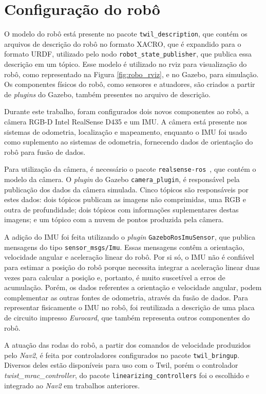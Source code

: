 \documentclass[repeatfields,xlists,xpacks,oneside,yearsonly]{ufrgscca}
\begin{document}
\section{Configuração do robô}

O modelo do robô está presente no pacote \texttt{twil\_description},
que contém os arquivos de descrição do robô no formato XACRO, que é
expandido para o formato URDF, utilizado pelo nodo
\texttt{robot\_state\_publisher}, que publica essa descrição em um
tópico. Esse modelo é utilizado no rviz para visualização do robô,
como representado na Figura \ref{fig:robo_rviz}, e no Gazebo, para
simulação. Os componentes físicos do robô, como sensores e atuadores,
são criados a partir de \textit{plugins} do Gazebo, também presentes
no arquivo de descrição.

Durante este trabalho, foram configurados dois novos componentes ao
robô, a câmera RGB-D Intel RealSense D435 e um IMU. A câmera está
presente nos sistemas de odometria, localização e mapeamento,
enquanto o IMU foi usado como suplemento ao sistemas de odometria,
fornecendo dados de orientação do robô para fusão de dados.

Para utilização da câmera, é necessário o pacote
\texttt{realsense-ros}~\cite{realsense_ros}, que contém o modelo da
câmera. O \textit{plugin} do Gazebo \texttt{camera\_plugin}, é
responsável pela publicação dos dados da câmera simulada. Cinco
tópicos são responsáveis por estes dados: dois tópicos publicam as
imagens não comprimidas, uma RGB e outra de profundidade; dois
tópicos com informações suplementares destas imagens; e um tópico com
a nuvem de pontos produzida pela câmera.

A adição do IMU foi feita utilizando o \textit{plugin}
\texttt{GazeboRosImuSensor}, que publica mensagens do tipo
\texttt{sensor\_msgs/Imu}. Essas mensagens contêm a orientação,
velocidade angular e aceleração linear do robô. Por si só, o IMU não
é confiável para estimar a posição do robô porque necessita integrar
a aceleração linear duas vezes para calcular a posição e, portanto, é
muito suscetível a erros de acumulação. Porém, os dados referentes a
orientação e velocidade angular, podem complementar as outras fontes
de odometria, através da fusão de dados. Para representar fisicamente
o IMU no robô, foi reutilizada a descrição de uma placa de circuito
impresso \textit{Eurocard}, que também representa outros componentes
do robô.

A atuação das rodas do robô, a partir dos comandos de velocidade
produzidos pelo \textit{Nav2}, é feita por controladores configurados
no pacote \texttt{twil\_bringup}. Diversos deles estão disponíveis
para uso com o Twil, porém o controlador
\textit{twist\_mrac\_controller}, do pacote
\texttt{linearizing\_controllers} foi o escolhido e integrado ao
\textit{Nav2} em trabalhos anteriores.
\end{document}
